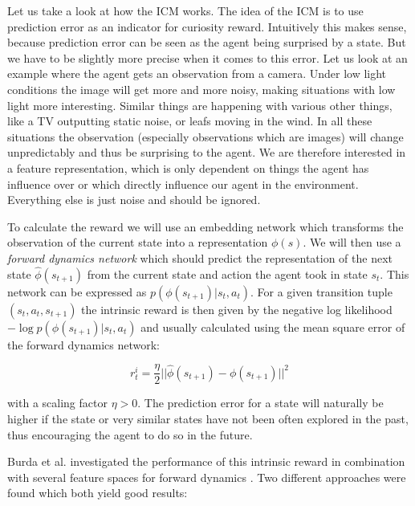Let us take a look at how the ICM works. The idea of the ICM is to use prediction error as an indicator for curiosity reward. Intuitively this makes sense, because prediction error can be seen as the agent being surprised by a state. But we have to be slightly more precise when it comes to this error. Let us look at an example where the agent gets an observation from a camera. Under low light conditions the image will get more and more noisy, making situations with low light more interesting. Similar things are happening with various other things, like a TV outputting static noise, or leafs moving in the wind. In all these situations the observation (especially observations which are images) will change unpredictably and thus be surprising to the agent. We are therefore interested in a feature representation, which is only dependent on things the agent has influence over or which directly influence our agent in the environment. Everything else is just noise and should be ignored. 

To calculate the reward we will use an embedding network which transforms the observation of the current state into a representation $\phi(s)$. We will then use a \textit{forward dynamics network} which should predict the representation of the next state $\hat{\phi}(s_{t+1})$ from the current state and action the agent took in state $s_t$. This network can be expressed as $p(\phi(s_{t+1})|s_t, a_t)$. For a given transition tuple $(s_t, a_t, s_{t+1})$ the intrinsic reward is then given by the negative log likelihood $-\log p(\phi(s_{t+1})|s_t, a_t)$ and usually calculated using the mean square error of the forward dynamics network:

\[r^i_t = \frac{\eta}{2}||\hat{\phi}(s_{t+1}) - \phi(s_{t+1})||^2\]

with a scaling factor $\eta > 0$. The prediction error for a state will naturally be higher if the state or very similar states have not been often explored in the past, thus encouraging the agent to do so in the future.

Burda et al. investigated the performance of this intrinsic reward in combination with several feature spaces for forward dynamics \cite{burda2018large}. Two different approaches were found which both yield good results: 

